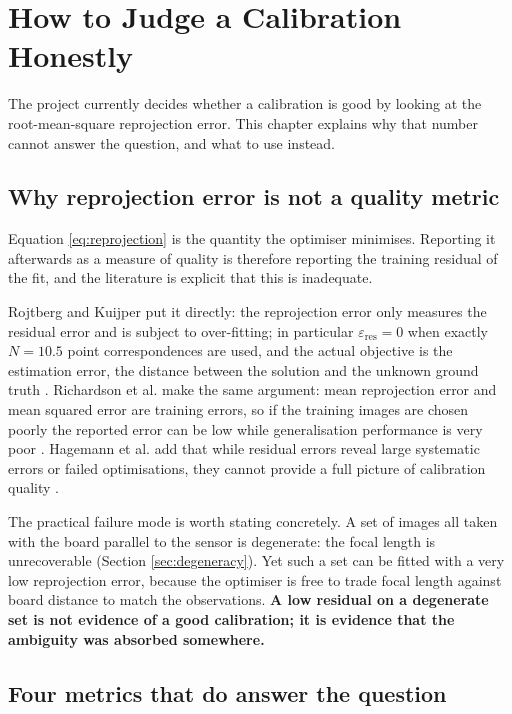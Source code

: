 \chapter{How to Judge a Calibration Honestly}
\label{chap:quality}

The project currently decides whether a calibration is good by looking at the root-mean-square reprojection error. This chapter explains why that number cannot answer the question, and what to use instead.

\section{Why reprojection error is not a quality metric}

Equation \ref{eq:reprojection} is the quantity the optimiser minimises. Reporting it afterwards as a measure of quality is therefore reporting the training residual of the fit, and the literature is explicit that this is inadequate.

Rojtberg and Kuijper put it directly: the reprojection error only measures the residual error and is subject to over-fitting; in particular $\varepsilon_{\mathrm{res}} = 0$ when exactly $N = 10.5$ point correspondences are used, and the actual objective is the estimation error, the distance between the solution and the unknown ground truth \cite{rojtberg2018pose}. Richardson et al. make the same argument: mean reprojection error and mean squared error are training errors, so if the training images are chosen poorly the reported error can be low while generalisation performance is very poor \cite{richardson2013aprilcal}. Hagemann et al. add that while residual errors reveal large systematic errors or failed optimisations, they cannot provide a full picture of calibration quality \cite{hagemann2021bias}.

The practical failure mode is worth stating concretely. A set of images all taken with the board parallel to the sensor is degenerate: the focal length is unrecoverable (Section \ref{sec:degeneracy}). Yet such a set can be fitted with a very low reprojection error, because the optimiser is free to trade focal length against board distance to match the observations. \textbf{A low residual on a degenerate set is not evidence of a good calibration; it is evidence that the ambiguity was absorbed somewhere.}

\section{Four metrics that do answer the question}

